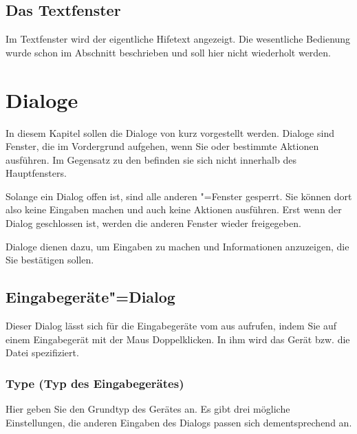 \section{Das Textfenster}
\label{sec:das-textfenster}


Im Textfenster wird der eigentliche Hifetext angezeigt. Die wesentliche Bedienung wurde schon im Abschnitt  beschrieben und soll hier nicht wiederholt werden.

\chapter{Dialoge}\label{sec:DE_DIALOGS}

In diesem Kapitel sollen die Dialoge von \mutabor{} kurz vorgestellt
werden.  Dialoge sind Fenster, die im Vordergrund aufgehen, wenn Sie
oder \mutabor{} bestimmte Aktionen ausführen. Im Gegensatz zu den
 befinden sie sich nicht
innerhalb des Hauptfensters.

Solange ein Dialog offen ist, sind alle anderen \mutabor"=Fenster
gesperrt. Sie können dort also keine Eingaben machen und auch keine
Aktionen ausführen. Erst wenn der Dialog geschlossen ist, werden die
anderen Fenster wieder freigegeben.

Dialoge dienen dazu, um Eingaben zu machen und Informationen
anzuzeigen, die Sie bestätigen sollen.  

\section{Eingabegeräte"=Dialog}
\label{sec:DE_R0}
Dieser Dialog lässt sich für die Eingabegeräte vom  
aus aufrufen, indem Sie auf einem Eingabegerät mit der Maus 
Doppelklicken. In ihm wird das Gerät bzw. die Datei spezifiziert.

\subsection{Type (Typ des Eingabegerätes)}


Hier geben Sie den Grundtyp des Gerätes an. Es gibt drei mögliche 
Einstellungen, die anderen Eingaben des Dialogs passen sich dementsprechend 
an.

